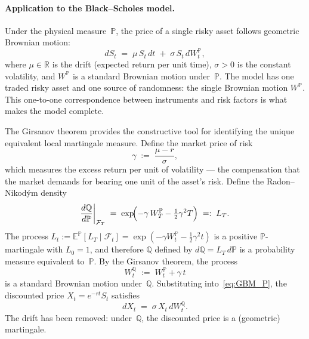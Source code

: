 \paragraph{Application to the Black--Scholes model.}
Under the physical measure~$\mathbb{P}$, the price of a single risky
asset follows geometric Brownian motion:
\begin{equation}
\label{eq:GBM_P}
dS_t \;=\; \mu \, S_t \, dt \;+\; \sigma \, S_t \, dW_t^{\mathbb{P}},
\end{equation}
where $\mu \in \mathbb{R}$ is the drift (expected return per unit time),
$\sigma > 0$ is the constant volatility, and $W^{\mathbb{P}}$ is a
standard Brownian motion under~$\mathbb{P}$.  The model has one traded
risky asset and one source of randomness: the single Brownian motion
$W^{\mathbb{P}}$.  This one-to-one correspondence between instruments and
risk factors is what makes the model complete.

The Girsanov theorem provides the constructive tool for identifying the
unique equivalent local martingale measure.  Define the market price of
risk
\begin{equation}
\label{eq:market_price_risk_BSM}
\gamma \;:=\; \frac{\mu - r}{\sigma},
\end{equation}
which measures the excess return per unit of volatility --- the
compensation that the market demands for bearing one unit of the asset's
risk.  Define the Radon--Nikod\'ym density
\begin{equation}
\label{eq:girsanov_BSM}
\frac{d\mathbb{Q}}{d\mathbb{P}} \bigg|_{\mathcal{F}_T}
\;=\; \exp\!\Bigl(-\gamma \, W_T^{\mathbb{P}}
      - \tfrac{1}{2} \gamma^2 T\Bigr)
\;=:\; L_T.
\end{equation}
The process $L_t := \mathbb{E}^{\mathbb{P}}[L_T \mid \mathcal{F}_t]
= \exp(-\gamma W_t^{\mathbb{P}} - \frac{1}{2}\gamma^2 t)$ is a positive
$\mathbb{P}$-martingale with $L_0 = 1$, and therefore $\mathbb{Q}$
defined by $d\mathbb{Q} = L_T \, d\mathbb{P}$ is a probability measure
equivalent to~$\mathbb{P}$.  By the Girsanov theorem, the process
\begin{equation}
\label{eq:girsanov_W}
W_t^{\mathbb{Q}} \;:=\; W_t^{\mathbb{P}} + \gamma \, t
\end{equation}
is a standard Brownian motion under~$\mathbb{Q}$.  Substituting
into~\eqref{eq:GBM_P}, the discounted price
$X_t = e^{-rt} S_t$ satisfies
\begin{equation}
\label{eq:GBM_Q}
dX_t \;=\; \sigma \, X_t \, dW_t^{\mathbb{Q}}.
\end{equation}
The drift has been removed: under~$\mathbb{Q}$, the discounted price is a
(geometric) martingale.

